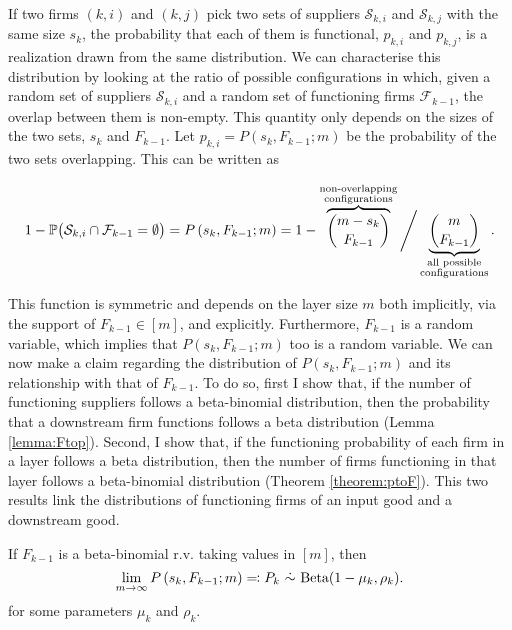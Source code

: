 \documentclass[../../main.tex]{subfiles}
\begin{document}
If two firms $(k, i)$ and $(k, j)$ pick two sets of suppliers $\mathcal{S}_{k, i}$ and $\mathcal{S}_{k, j}$ with the same size $s_k$, the probability that each of them is functional, $p_{k, i}$ and $p_{k, j}$, is a realization drawn from the same distribution. We can characterise this distribution by looking at the ratio of possible configurations in which, given a random set of suppliers $\mathcal{S}_{k, i}$ and a random set of functioning firms $\mathcal{F}_{k - 1}$, the overlap between them is non-empty. This quantity only depends on the sizes of the two sets, $s_k$ and $F_{k - 1}$. Let $p_{k, i} = P(s_k, F_{k - 1}; m)$ be the probability of the two sets overlapping. This can be written as 

\begin{equation}
  1 - \P\big( \mathcal{S}_{k, i} \cap \mathcal{F}_{k - 1} = \emptyset \big) = P\left(s_k, F_{k - 1}; m\right) =  1 - \overbrace{\binom{m - s_k}{F_{k-1}}}^{\substack{\text{non-overlapping} \\ \text{configurations}}} \Bigg/ \underbrace{\binom{m}{F_{k-1}}}_{\substack{\text{all possible} \\ \text{configurations}}}. 
\end{equation}

This function is symmetric and depends on the layer size $m$ both implicitly, via the support of $F_{k - 1} \in [m]$, and explicitly. Furthermore, $F_{k - 1}$ is a random variable, which implies that $P(s_k, F_{k - 1}; m)$ too is a random variable. We can now make a claim regarding the distribution of $P(s_k, F_{k - 1}; m)$ and its relationship with that of $F_{k - 1}$. To do so, first I show that, if the number of functioning suppliers follows a beta-binomial distribution, then the probability that a downstream firm functions follows a beta distribution (Lemma \ref{lemma:Ftop}). Second, I show that, if the functioning probability of each firm in a layer follows a beta distribution, then the number of firms functioning in that layer follows a beta-binomial distribution (Theorem \ref{theorem:ptoF}). This two results link the distributions of functioning firms of an input good and a downstream good.

\begin{lemma} \label{lemma:Ftop}
  If $F_{k - 1}$ is a beta-binomial r.v. taking values in $[m]$, then \begin{equation*}\lim_{m \rightarrow \infty} P\left(s_k, F_{k - 1}; m\right) \eqqcolon P_k \ \dot{\sim} \ \Beta(1 - \mu_k, \rho_k).\end{equation*} for some parameters $\mu_k$ and $\rho_k$.
\end{lemma}
\end{document}
